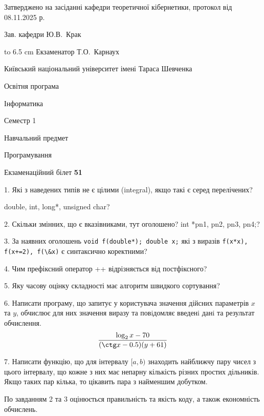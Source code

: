 \documentclass[12pt, ukrainian]{article}
\def\code#1{\Verb!#1!}
\begin{document}
{\smallskip\smallskip \begin {scriptsize} Затверджено на засіданні кафедри теоретичної кібернетики, протокол   від   08.11.2025 р.\par\smallskip\smallskip\smallskip\smallskip
{\parbox {6.5 cm} {Зав. кафедри \dotfill Ю.В.~Крак}}\hspace {0.7cm} {\hbox to 6.5 cm { Екзаменатор \dotfill Т.О.~Карнаух}} \end{scriptsize}}
\newpage
{{\begin {scriptsize}\par
{ \center  Київський національний університет імені Тараса Шевченка \par}
{\parbox {5 cm}{Освітня програма \hfill}{\parbox {7 cm}{Інформатика\hfill}}\parbox {6 cm}{\hfill Семестр 1}}\par
{\parbox {5 cm} {Навчальний предмет \hfill}\parbox {7 cm}{Програмування \hfill}\parbox {6cm}{\hfill}\par}\vspace{-15pt} \end{scriptsize}}{\center Екзаменаційний білет \No \textbf { 51 }\par}}
{%
1. Які з наведених типів не є цілими (integral), якщо такі є серед перелічених?

double, int, long*, unsigned char?
\par
\vspace{2mm}
2. Скільки змінних, що є вказівниками, тут оголошено?
int *pn1, pn2, pn3, pn4;?
\par
\vspace{2mm}
3. За наявних оголошень \code{void f(double*); double x;} які з виразів \code{f(x*x), f(x+=2), f(\&x)} є синтаксично коректними?
\par
\vspace{2mm}
4. Чим префіксний оператор ++ відрізняється від постфіксного?
\par
\vspace{2mm}
5. Яку часову оцінку складності має алгоритм швидкого сортування?
\par
\vspace{2mm}
6. Написати програму, що запитує у користувача значення дійсних параметрів $x$ та $y$, обчислює для них значення виразу та повiдомляє введенi данi та результат обчислення.
$$\frac{\log_{2} x - 70}{(\ctg x - 0.5) (y + 61)}$$ 

\par
7. Написати функцію, що для інтервалу $[a, b)$ знаходить найближчу пару чисел з цього інтервалу, що кожне з них має непарну кількість різних простих дільників. Якщо таких пар кілька, то цікавить пара з найменшим добутком.

По завданням 2 та 3 оцінюється правильність та якість коду, а також економність обчислень.

}
\end{document}

